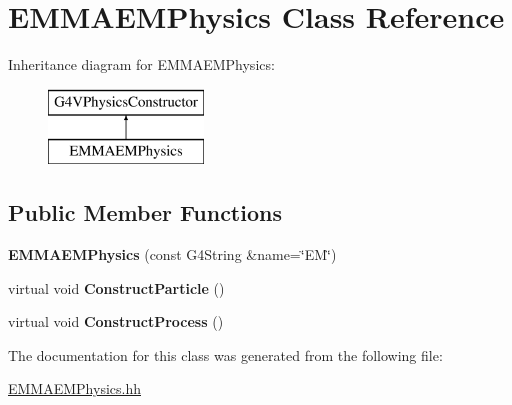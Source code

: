 \hypertarget{classEMMAEMPhysics}{\section{E\-M\-M\-A\-E\-M\-Physics Class Reference}
\label{classEMMAEMPhysics}
}
Inheritance diagram for E\-M\-M\-A\-E\-M\-Physics\-:\begin{figure}[H]
\begin{center}
\leavevmode
\includegraphics[height=2.000000cm]{classEMMAEMPhysics}
\end{center}
\end{figure}
\subsection*{Public Member Functions}
\begin{DoxyCompactItemize}
\item 
\hypertarget{classEMMAEMPhysics_a0bdeb762644c75e671a5ec4ed18b7d22}{{\bfseries E\-M\-M\-A\-E\-M\-Physics} (const G4\-String \&name=\char`\"{}E\-M\char`\"{})}\label{classEMMAEMPhysics_a0bdeb762644c75e671a5ec4ed18b7d22}

\item 
\hypertarget{classEMMAEMPhysics_a60dd2fc0de0b419c8d9ab1aa11bad822}{virtual void {\bfseries Construct\-Particle} ()}\label{classEMMAEMPhysics_a60dd2fc0de0b419c8d9ab1aa11bad822}

\item 
\hypertarget{classEMMAEMPhysics_a704c4375bec4f4cde7e2828efa3ae175}{virtual void {\bfseries Construct\-Process} ()}\label{classEMMAEMPhysics_a704c4375bec4f4cde7e2828efa3ae175}

\end{DoxyCompactItemize}


The documentation for this class was generated from the following file\-:\begin{DoxyCompactItemize}
\item 
\hyperlink{EMMAEMPhysics_8hh}{E\-M\-M\-A\-E\-M\-Physics.\-hh}\end{DoxyCompactItemize}
